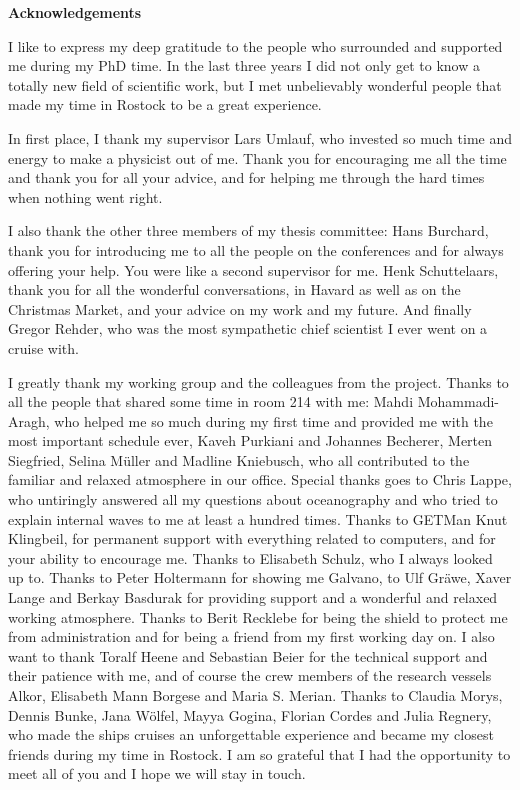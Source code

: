 \newpage
\thispagestyle{plain}
\begin{center}
 \textbf{Acknowledgements}
\end{center}

I like to express my deep gratitude to the people who surrounded and supported 
me during my PhD time. In the last three years I did not only get to know a 
totally new field of scientific work, but I met unbelievably wonderful 
people that made my time in Rostock to be a great experience. 

In first place, I thank my supervisor Lars Umlauf, who invested so much time 
and energy to make a physicist out of me. Thank you for encouraging me all the 
time and thank you for all your advice, and for helping me through the hard 
times when nothing went right.

I also thank the other three members of my thesis committee: Hans Burchard, 
thank you for introducing me to all the people on the conferences and for 
always offering your help. You were like a second supervisor for me. Henk 
Schuttelaars, thank you for all the wonderful conversations, in Havard as well 
as on the Christmas Market, and your advice on my work and my future. And 
finally Gregor Rehder, who was the most sympathetic chief scientist I ever went 
on a cruise with. 

I greatly thank my working group and the colleagues from the project. Thanks 
to all the people that shared some time in room 214 with me: Mahdi 
Mohammadi-Aragh, who helped me so much during my first time and provided me with 
the most important schedule ever, Kaveh Purkiani and Johannes Becherer, Merten 
Siegfried, Selina Müller and Madline Kniebusch, who all contributed to the 
familiar and relaxed atmosphere in our office. Special thanks goes to Chris 
Lappe, who untiringly answered all my questions about oceanography and who tried 
to explain internal waves to me at least a hundred times. Thanks to GETMan Knut 
Klingbeil, for permanent support with everything related to computers, and for 
your ability to encourage me. Thanks to Elisabeth Schulz, who I always looked up 
to. Thanks to Peter Holtermann for showing me Galvano, to Ulf Gräwe, 
Xaver Lange and Berkay Basdurak for providing support and a wonderful and 
relaxed working atmosphere. Thanks to Berit Recklebe for being the shield to 
protect me from administration and for being a friend from my first working day 
on. I also want to thank Toralf Heene and Sebastian Beier for the technical 
support and their patience with me, and of course the crew members of the 
research vessels Alkor, Elisabeth Mann Borgese and Maria S. Merian. Thanks to 
Claudia Morys, Dennis Bunke, Jana Wölfel, Mayya Gogina, Florian Cordes and Julia 
Regnery, who made the ships cruises an unforgettable experience and became my 
closest friends during my time in Rostock.\newpage
\thispagestyle{plain} I am so grateful that I had the opportunity to meet all of 
you and I hope we will stay in touch.

